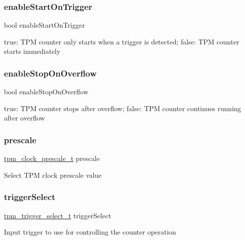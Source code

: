 \subsubsection{\texorpdfstring{enableStartOnTrigger}{enableStartOnTrigger}}
{\footnotesize\ttfamily bool enable\+Start\+On\+Trigger}

true\+: T\+PM counter only starts when a trigger is detected; false\+: T\+PM counter starts immediately \mbox{\label{struct__tpm__config_a8dc09bef3942120a287e07d6f55a291e}} 
\subsubsection{\texorpdfstring{enableStopOnOverflow}{enableStopOnOverflow}}
{\footnotesize\ttfamily bool enable\+Stop\+On\+Overflow}

true\+: T\+PM counter stops after overflow; false\+: T\+PM counter continues running after overflow \mbox{\label{struct__tpm__config_a07aeffac07e1ce1b00be27db7a55f8b4}} 
\subsubsection{\texorpdfstring{prescale}{prescale}}
{\footnotesize\ttfamily \mbox{\hyperlink{group__tpm_gad9e7d333c0c3ad41d6bc740d95004dac}{tpm\+\_\+clock\+\_\+prescale\+\_\+t}} prescale}

Select T\+PM clock prescale value \mbox{\label{struct__tpm__config_a6d30d8f871d548b2a9b1533373c5234d}} 
\subsubsection{\texorpdfstring{triggerSelect}{triggerSelect}}
{\footnotesize\ttfamily \mbox{\hyperlink{group__tpm_ga7413575956cb565fba0cc99c39c73bc7}{tpm\+\_\+trigger\+\_\+select\+\_\+t}} trigger\+Select}

Input trigger to use for controlling the counter operation \mbox{\label{struct__tpm__config_af416ab48aec0988cb89bfd89ec771062}} 
